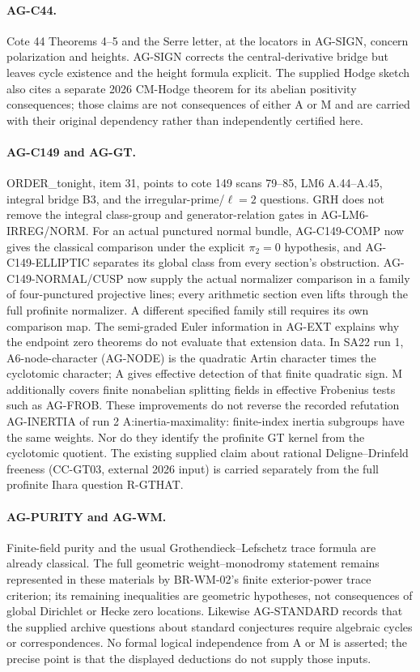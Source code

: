 \paragraph{AG-C44.} Cote 44 Theorems 4--5 and the Serre letter, at the
locators in AG-SIGN, concern polarization and heights. AG-SIGN corrects
the central-derivative bridge but leaves cycle existence and the
height formula explicit. The supplied Hodge sketch also cites a separate
2026 CM-Hodge theorem for its abelian positivity consequences; those
claims are not consequences of either A or M and are carried with
their original dependency rather than independently certified here.

\paragraph{AG-C149 and AG-GT.} ORDER\_tonight, item 31, points to cote
149 scans 79--85, LM6 A.44--A.45, integral bridge B3, and the
irregular-prime/$\ell=2$ questions. GRH does not remove the integral
class-group and generator-relation gates in AG-LM6-IRREG/NORM.
For an actual punctured normal bundle, AG-C149-COMP now gives the
classical comparison under the explicit $\pi_2=0$ hypothesis, and
AG-C149-ELLIPTIC separates its global class from every section's
obstruction. AG-C149-NORMAL/CUSP now supply the actual normalizer
comparison in a family of four-punctured projective lines; every
arithmetic section even lifts through the full profinite normalizer.
A different specified family still requires its own comparison map.
The semi-graded Euler information in AG-EXT explains why the endpoint
zero theorems do not evaluate that extension data. In SA22 run 1,
A6-node-character (AG-NODE) is the quadratic Artin character times the cyclotomic
character; A gives effective detection of that finite quadratic sign.
M additionally covers finite nonabelian splitting fields in effective
Frobenius tests such as AG-FROB. These improvements do not reverse the
recorded refutation AG-INERTIA of run 2 A:inertia-maximality: finite-index inertia
subgroups have the same weights. Nor do they identify the profinite GT
kernel from the cyclotomic quotient. The existing supplied claim about
rational Deligne--Drinfeld freeness (CC-GT03, external 2026 input) is
carried separately from the full profinite Ihara question R-GTHAT.

\paragraph{AG-PURITY and AG-WM.} Finite-field purity and the usual
Grothendieck--Lefschetz trace formula are already classical. The full
geometric weight--monodromy statement remains represented in these
materials by BR-WM-02's finite exterior-power trace criterion; its
remaining inequalities are geometric hypotheses, not consequences of
global Dirichlet or Hecke zero locations. Likewise AG-STANDARD records that the supplied archive
questions about standard conjectures require algebraic cycles or
correspondences. No formal logical independence from A or M is asserted;
the precise point is that the displayed deductions do not supply those
inputs.
